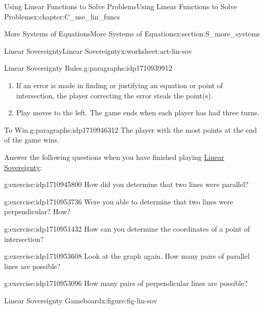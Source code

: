 \documentclass[oneside,10pt,]{book}
\numberwithin{equation}{chapter}
\begin{document}
\begin{chapterptx}{Using Linear Functions to Solve Problems}{}{Using Linear Functions to Solve Problems}{}{}{x:chapter:C_use_lin_funcs}
\begin{sectionptx}{More Systems of Equations}{}{More Systems of Equations}{}{}{x:section:S_more_systems}
\begin{worksheet-subsection}{Linear Sovereignty}{}{Linear Sovereignty}{}{}{x:worksheet:act-lin-sov}
\begin{paragraphs}{Linear Sovereignty Rules.}{g:paragraphs:idp1710939912}
\begin{enumerate}[label=(\alph*)]
\begin{itemize}[label=\textbullet]
\item{}1 point for constructing a line parallel or perpendicular to an existing line.%
\end{itemize}
%
\item{}If an error is made in finding or justifying an equation or point of intersection, the player correcting the error steals the point(s).%
\item{}Play moves to the left. The game ends when each player has had three turns.%
\end{enumerate}
%
\end{paragraphs}%
\begin{paragraphs}{To Win.}{g:paragraphs:idp1710946312}%
The player with the most points at the end of the game wins.%
\end{paragraphs}%
\par
Answer the following questions when you have finished playing \hyperref[x:worksheet:act-lin-sov]{Linear Sovereignty}:%
\begin{divisionexercise}{1}{}{}{g:exercise:idp1710945800}%
How did you determine that two lines were parallel?%
\end{divisionexercise}%
\begin{divisionexercise}{2}{}{}{g:exercise:idp1710953736}%
Were you able to determine that two lines were perpendicular? How?%
\end{divisionexercise}%
\begin{divisionexercise}{3}{}{}{g:exercise:idp1710951432}%
How can you determine the coordinates of a point of intersection?%
\end{divisionexercise}%
\begin{divisionexercise}{4}{}{}{g:exercise:idp1710953608}%
Look at the graph again. How many pairs of parallel lines are possible?%
\end{divisionexercise}%
\begin{divisionexercise}{5}{}{}{g:exercise:idp1710953096}%
How many pairs of perpendicular lines are possible?%
\end{divisionexercise}%
\clearpage
\begin{figureptx}{Linear Sovereignty Gameboard}{x:figure:fig-lin-sov}{}%
\begin{image}{0}{1}{0}%

\end{image}
\end{figureptx}
\end{worksheet-subsection}
\end{sectionptx}
\end{chapterptx}
\end{document}
